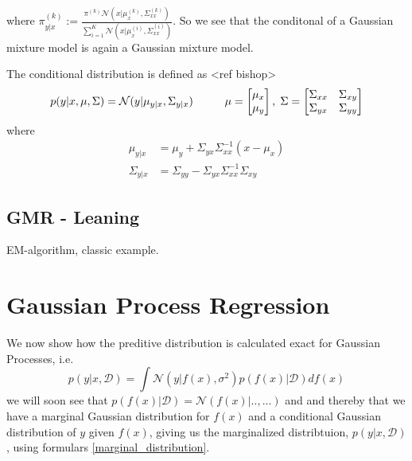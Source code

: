 where $\pi_{y|x}^{(k)} := \frac{\pi^{(k)} \mathcal{N}(x|\mu_{x}^{(k)},\Sigma_{xx}^{(k)})}
{\sum_{i=1}^K \mathcal{N}(x|\mu_{x}^{(i)},\Sigma_{xx}^{(i)})}$. So we see that 
the conditonal of a Gaussian mixture model is again a Gaussian mixture model.


\begin{testexample2}
    The conditional distribution is defined as <ref bishop>
    $$p(y|x,\mu, \Sigma) = \mathcal{N}(y|\mu_{y|x},\Sigma_{y|x} )\hspace{1cm} \mu=\begin{bmatrix}
        \mu_x \\ \mu_y
    \end{bmatrix},\hspace{0.1cm} \Sigma = \begin{bmatrix}
        \Sigma_{xx} & \Sigma_{xy}\\ \Sigma_{yx}& \Sigma_{yy}
    \end{bmatrix}$$ 
    where 
    \begin{align}
        \mu_{y|x} &= \mu_y+\Sigma_{yx}\Sigma_{xx}^{-1}(x-\mu_x)\\
        \Sigma_{y|x} &= \Sigma_{yy}-\Sigma_{yx}\Sigma_{xx}^{-1}\Sigma_{xy} 
    \end{align}
    
\end{testexample2}


\subsection{GMR - Leaning}

EM-algorithm, classic example. 

\section{Gaussian Process Regression}
We now show how the preditive distribution is calculated exact for
Gaussian Processes, i.e. 
\begin{equation}\label{GP_predictive}
    p(y|x,\mathcal{D}) = \int \mathcal{N}(y|f(x), \sigma^2) p(f(x)|\mathcal{D})df(x)
\end{equation}
we will soon see that $p(f(x)|\mathcal{D}) = \mathcal{N}(f(x)| .., ...)$ and
and thereby that we have a marginal Gaussian distribution for $f(x)$ and a 
conditional Gaussian distribution of $y$ given $f(x)$, giving us the marginalized
distribtuion, $p(y|x,\mathcal{D})$, using formulars \eqref{marginal_distribution}. 

